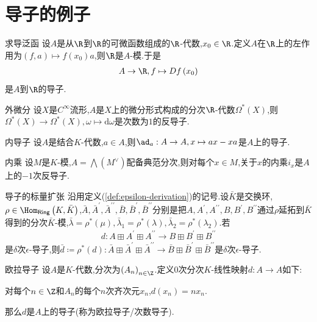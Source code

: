 \section{导子的例子}

\begin{example}{求导泛函}{}
	设$A$是从$\R$到$\R$的可微函数组成的$\R$-代数,$x_{0}\in\R$.定义$A$在$\R$上的左作用为$\left(f,a\right)\mapsto f\left(x_{0}\right)a$,则$\R$是$A$-模.于是
	\begin{align*}
		A\to\R,f\mapsto Df\left(x_{0}\right)
	\end{align*}
	是$A$到$\R$的导子.
\end{example}

\begin{example}{外微分}{}
	设$X$是$C^{\infty}$流形,$A$是$X$上的微分形式构成的分次$\R$-代数$\Omega^{\ast}\left(X\right)$,则$\Omega^{\ast}\left(X\right)\to\Omega^{\ast}\left(X\right),\omega\mapsto \mathrm{d}\omega$是次数为$1$的反导子.
\end{example}

\begin{example}{内导子}{}
	设$A$是结合$K$-代数,$a\in A$,则$\ad_{a}:A\to A,x\mapsto ax-xa$是$A$上的导子.
\end{example}

\begin{example}{内乘}{}
	设$M$是$K$-模,$A=\bigwedge\left(M^{\vee}\right)$配备典范分次,则对每个$x\in M$,关于$x$的内乘$i_{x}$是$A$上的$-1$次反导子.
\end{example}

\begin{example}{导子的标量扩张}{}
	沿用定义(\ref{def:epsilon-derivation})的记号.设$\bar{K}$是交换环,$\rho\in\Hom_{\mathsf{Ring}}\left(K,\bar{K}\right)$,$\bar{A},\bar{A}^{\prime},\bar{A}^{\prime\prime},\bar{B},\bar{B}^{\prime},\bar{B}^{\prime\prime}$分别是把$A,A^{\prime},A^{\prime\prime},B,B^{\prime},B^{\prime\prime}$通过$\rho$延拓到$\bar{K}$得到的分次$\bar{K}$-模,$\bar{\lambda}=\rho^{\ast}\left(\mu\right),\bar{\lambda}_{1}=\rho^{\ast}\left(\lambda\right),\bar{\lambda}_{2}=\rho^{\ast}\left(\lambda_{2}\right)$.若
	\begin{align*}
		d:A\boxplus A^{\prime}\boxplus A^{\prime\prime}\to B\boxplus B^{\prime}\boxplus B^{\prime\prime}
	\end{align*}
	是$\delta$次$\epsilon$-导子,则$\bar{d}\coloneq\rho^{\ast}\left(d\right):\bar{A}\boxplus \bar{A}^{\prime}\boxplus \bar{A}^{\prime\prime}\to \bar{B}\boxplus \bar{B}^{\prime}\boxplus \bar{B}^{\prime\prime}$是$\delta$次$\epsilon$-导子.
\end{example}

\begin{example}{欧拉导子}{}
	设$A$是$K$-代数,分次为$\left(A_{n}\right)_{n\in\Z}$.定义$0$次分次$K$-线性映射$d:A\to A$如下:
	\begin{center}
		对每个$n\in\Z$和$A_{n}$的每个$n$次齐次元$x_{n}$,$d\left(x_{n}\right)=nx_{n}$.
	\end{center}
	那么$d$是$A$上的导子(称为欧拉导子/次数导子).
\end{example}















